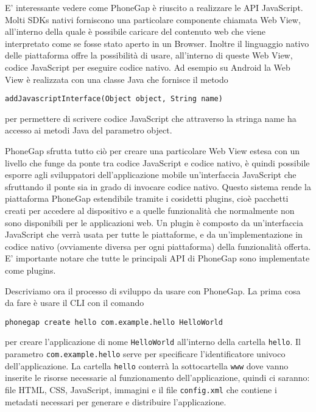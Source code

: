 			E' interessante vedere come PhoneGap è riuscito a realizzare le API 
			JavaScript.
			Molti SDKs nativi forniscono una particolare componente chiamata 
			Web View, all'interno della quale è possibile caricare del contenuto 
			web che viene interpretato come se fosse stato aperto in 
			un Browser.
			Inoltre il linguaggio nativo delle piattaforma offre la possibilità 
			di usare, all'interno di queste Web View, codice JavaScript per 
			eseguire codice nativo.
			Ad esempio su Android la Web View è realizzata con una classe Java 
			che fornisce il metodo
	\begin{lstlisting}[language=MyJava]
	addJavascriptInterface(Object object, String name)
	\end{lstlisting}
			per permettere 
			di scrivere codice JavaScript che attraverso la stringa name ha accesso 
			ai metodi Java del parametro object.
						
			PhoneGap sfrutta tutto ciò per creare una particolare 
			Web View estesa con un livello che funge da ponte
			tra codice JavaScript e codice nativo, è quindi possibile esporre 
			agli sviluppatori dell'applicazione mobile un'interfaccia JavaScript 
			che sfruttando il ponte sia in grado di invocare codice nativo.
			Questo sistema rende la piattaforma PhoneGap estendibile tramite i cosidetti
			plugins, cioè pacchetti creati per accedere al dispositivo e a quelle 
			funzionalità che normalmente non sono disponibili per le applicazioni 
			web. Un plugin è composto da un'interfaccia JavaScript che 
			verrà usata per tutte le piattaforme, e da un'implementazione 
			in codice nativo (ovviamente diversa per ogni piattaforma)
			della funzionalità offerta.
			E' importante notare che tutte le principali API di PhoneGap sono 
			implementate come plugins.
			
			Descriviamo ora il processo di sviluppo da usare con PhoneGap.
			La prima cosa da fare è usare il CLI con il comando 
	\begin{lstlisting}[language=MyBash]
	phonegap create hello com.example.hello HelloWorld
	\end{lstlisting}
			per creare l'applicazione di nome \verb|HelloWorld| all'interno della cartella 
			\verb|hello|. Il parametro \verb|com.example.hello| serve per 
			specificare l'identificatore univoco dell'applicazione.
			La cartella \verb|hello| conterrà la sottocartella \verb|www| dove 
			vanno inserite le risorse necessarie al funzionamento dell'applicazione, 
			quindi ci saranno: file HTML, CSS, JavaScript, immagini e il file 
			\verb|config.xml| che contiene i metadati necessari per generare e 
			distribuire l'applicazione.
			
